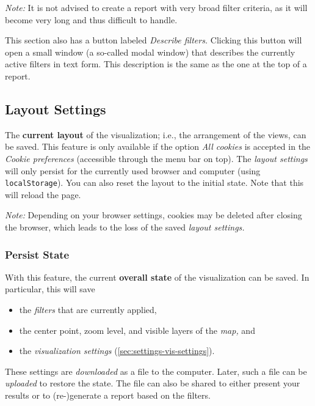 \emph{Note:} It is not advised to create a report with very broad filter criteria, as it will become very long and thus difficult to handle.

This section also has a button labeled \emph{Describe filters.}
Clicking this button will open a small window (a so-called modal window) that describes the currently active filters in text form.
This description is the same as the one at the top of a report.


\subsection{Layout Settings}

The \textbf{current layout} of the visualization; i.e., the arrangement of the views, can be saved.
This feature is only available if the option \emph{All cookies} is accepted in the \emph{Cookie preferences} (accessible through the menu bar on top).
The \emph{layout settings} will only persist for the currently used browser and computer (using \verb!localStorage!).
You can also reset the layout to the initial state. Note that this will reload the page.

\emph{Note:} Depending on your browser settings, cookies may be deleted after closing the browser, which leads to the loss of the saved \emph{layout settings.}


\subsubsection{Persist State}
\label{sec:settings-persist-state}
\label{sec:vis-reproducible}

With this feature, the current \textbf{overall state} of the visualization can be saved.
In particular, this will save

\begin{itemize}
  \item the \emph{filters} that are currently applied,
  \item the center point, zoom level, and visible layers of the \emph{map,} and
  \item the \emph{visualization settings} (\cref{sec:settings-vis-settings}).
\end{itemize}

These settings are \emph{downloaded} as a file to the computer.
Later, such a file can be \emph{uploaded} to restore the state.
The file can also be shared to either present your results or to (re-)generate a report based on the filters.


